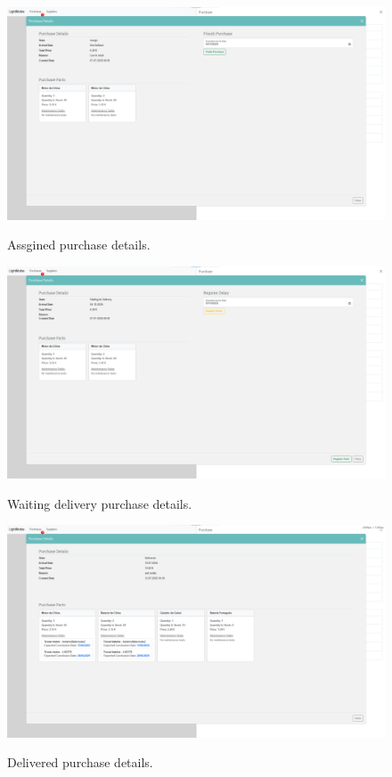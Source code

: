 \begin{figure}[htbp]
  \caption{Assgined purchase details.}
  \centering
  \includegraphics[width=\textwidth]{figs/Implementation/warehouse/PurchaseDetails}
  \label{fig:PurchaseDetails}
\end{figure}


\begin{figure}[htbp]
  \caption{Waiting delivery purchase details.}
  \centering
  \includegraphics[width=\textwidth]{figs/Implementation/warehouse/PurchaseRegisterParts}
  \label{fig:PurchaseRegisterParts}
\end{figure}


\begin{figure}[htbp]
  \caption{Delivered purchase details.}
  \centering
  \includegraphics[width=\textwidth]{figs/Implementation/warehouse/PurchaseFinishedDetails}
  \label{fig:PurchaseFinishedDetails}
\end{figure}




